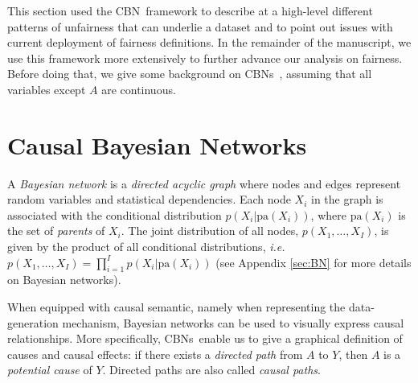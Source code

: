 \documentclass[runningheads]{llncs}
\newcommand{\appref}[1]{Appendix \ref{#1}}
\newcommand{\ie}{\emph{i.e.}}
\newcommand{\CBN}{CBN}
\newcommand{\CBNs}{CBNs}
\begin{document}
This section used the \CBN~framework to describe at a high-level different patterns of unfairness that can underlie a dataset and to point out issues with current deployment of fairness definitions. In the remainder of the manuscript, we use this framework more extensively to further advance our analysis on fairness. Before doing that, we give some background on \CBNs~\cite{dawid07fundamentals,pearl00causality,pearl16causal,peters16elements,spirtes00causation}, assuming that all variables except $A$ are continuous. 

\section{Causal Bayesian Networks\label{sec:CBN}}
A \emph{Bayesian network} is a \emph{directed acyclic graph} where nodes and edges represent random variables and statistical dependencies. Each node $X_i$ in the graph is associated with the conditional distribution $p(X_i|\textrm{pa}(X_i))$, where $\textrm{pa}(X_i)$ is the set of \emph{parents} of $X_i$. The joint distribution of all nodes, $p(X_1, \ldots, X_I)$, is given by the product of all conditional distributions, \ie~$p(X_1,\ldots,X_I)=\prod_{i=1}^Ip(X_i|\textrm{pa}(X_i))$ (see \appref{sec:BN} for more details on Bayesian networks).

When equipped with causal semantic, namely when representing the data-generation mechanism, Bayesian networks can be used to visually express causal relationships. More specifically, \CBNs~enable us to give a graphical definition of causes and causal effects: if there exists a \emph{directed  path} from $A$ to $Y$, then $A$ is a \emph{potential cause} of $Y$. Directed paths are also called \emph{causal paths}. 
\end{document}
